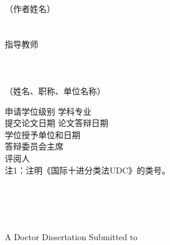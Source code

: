 {\begin{titlepage}
\begin{center}
{~}\\
{~}\\
\\
{（作者姓名）}\\
{~}\\
{~}\\
{指导教师}\\[5bp]
{\qquad\qquad}\\[5bp]
{\qquad\qquad}\\[5bp]
{\qquad\qquad}\\[5bp]
{（姓名、职称、单位名称）}\\[8bp]
\end{center}
{申请学位级别}
{学科专业}\\[13bp]
{提交论文日期}
{论文答辩日期}\\[13bp]
{学位授予单位和日期}\\[13bp]
{答辩委员会主席}\\[13bp]
{评阅人}\\
\vfill
{注1：注明《国际十进分类法UDC》的类号。}
\newpage
\thispagestyle{empty}
\begin{center}
{~}\\
{~}\\
{~}\\
{\bf{}\@englishtitle}\\
\vfill
{A Doctor Dissertation Submitted to}\\[1ex]

\end{center}
\end{titlepage}}
